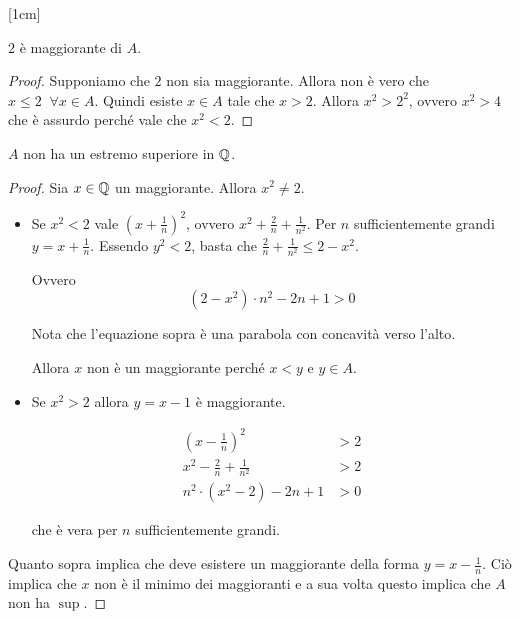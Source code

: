 [1cm]
\begin{proposition}
$2$ è maggiorante di $A$.
\end{proposition}
\begin{proof}
Supponiamo che $2$ non sia maggiorante. Allora non è vero che $x \le 2 \; \; \forall x \in A$. Quindi esiste $x \in A$ tale che $x > 2$. Allora $x^2 > 2^2$, ovvero $x^2 > 4$ che è assurdo perché vale che $x^2 < 2$.
\end{proof}
\begin{proposition}
$A$ non ha un estremo superiore in $\mathbb Q$.
\end{proposition}
\begin{proof}
Sia $x \in \mathbb Q$ un maggiorante. Allora $x^2 \neq 2$. 

\begin{itemize}
[1cm]
\item 
Se $x^2 < 2$ vale $(x+\frac{1}{n})^2$, ovvero $x^2 + \frac{2}{n} + \frac{1}{n^2}$.
Per $n$ sufficientemente grandi $y = x + \frac{1}{n}$. Essendo $y^2 < 2$, basta che $\frac{2}{n} + \frac{1}{n^2} \le 2 - x^2$.

Ovvero
\begin{equation*}
(2 - x^2) \cdot n^2 - 2n + 1 > 0 
\end{equation*} 

Nota che l'equazione sopra è una parabola con concavità verso l'alto. 

Allora $x$ non è un maggiorante perché $x < y$ e $y \in A$.

\item 
Se $x^2 > 2$ allora $y = x - 1$ è maggiorante.

\begin{align*}
(x-\frac{1}{n})^2 &> 2 \\
x^2 - \frac{2}{n} + \frac{1}{n^2} &> 2 \\
n^2 \cdot (x^2 - 2) - 2n + 1 &> 0
\end{align*}

che è vera per $n$ sufficientemente grandi.

\end{itemize}

Quanto sopra implica che deve esistere un maggiorante della forma $y = x - \frac{1}{n}$. Ciò implica che $x$ non è il minimo dei maggioranti e a sua volta questo implica che $A$ non ha $\sup$.

\end{proof}

